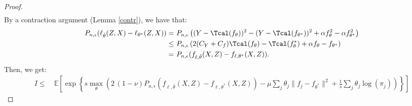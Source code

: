 \documentclass[12pt]{extarticle} %
\newcommand{\E}{\mathbb{E}}
\begin{document}
\begin{proof}
\begin{align*}
\end{align*}
By a contraction argument (Lemma \ref{contr}), we have that:
\begin{align*}
    P_{n,\epsilon}(\ell_{\hat{\theta}}(Z,X) - \ell_{\theta^*}(Z,X)) =~& P_{n,\epsilon}\left((Y - \Tcal(f_{\theta}))^2 - (Y - \Tcal(f_{\theta^*}))^2 + \alpha  f_{\theta}^2 - \alpha f_{\theta^*}^2\right)\\
    \leq~& P_{n,\epsilon}\left(2(C_Y+C_f)\Tcal(f_{\theta}) - \Tcal(f_{\theta}^*) + \alpha f_{\theta}-f_{\theta^*}\right)\\
    =~&P_{n,\epsilon}(f_{\ell,\hat{\theta}}(X,Z) - f_{\ell,\theta^*}(X,Z)).
\end{align*}
Then, we get:
\begin{align*}
    I\leq~& \E\left[\exp\left\{s \max_{\theta} \left(2\,(1-\nu) P_{n,\epsilon}(f_{\ell,\hat{\theta}}(X,Z) - f_{\ell,\theta^*}(X,Z)) - \mu \sum_j \theta_j \|f_j - f_{\theta^*}\|^2 +\frac{1}{s}\sum_j\theta_j \log(\pi_j)\right)\right\}\right]
\end{align*}


\end{proof}
\end{document}
